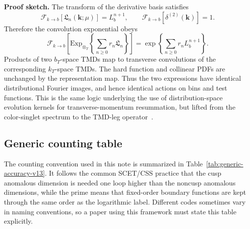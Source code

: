\documentclass[11pt]{article}
\newcommand{\bk}{\bm{k}}
\newcommand{\deltaT}{\delta^{(2)}}
\newcommand{\ExpT}{\mathrm{Exp}_{\otimes_T}}
\begin{document}
\noindent\textbf{Proof sketch.}
The transform of the derivative basis satisfies
\begin{equation}
  \mathcal F_{k\to b}\!\left[\mathfrak L_n(\bk;\mu)\right]=L_b^{n+1},
  \qquad
  \mathcal F_{k\to b}\!\left[\deltaT(\bk)\right]=1 .
  \label{eq:accuracy-transform-dictionary-v13}
\end{equation}
Therefore the convolution exponential obeys
\begin{equation}
  \mathcal F_{k\to b}\!\left[
  \ExpT\left\{\sum_{n\ge0} r_n\mathfrak L_n\right\}
  \right]
  =
  \exp\!\left\{\sum_{n\ge0}r_nL_b^{n+1}\right\}.
  \label{eq:accuracy-exponential-proof-v13}
\end{equation}
Products of two $b_T$-space TMDs map to transverse convolutions of the corresponding
$k_T$-space TMDs.  The hard function and collinear PDFs are unchanged by the
representation map.  Thus the two expressions have identical distributional Fourier images,
and hence identical actions on bins and test functions.  This is the same logic underlying the
use of distribution-space evolution kernels for transverse-momentum resummation, but lifted
from the color-singlet spectrum to the TMD-leg operator~\cite{EbertTackmann2017}.

\subsection{Generic counting table}

The counting convention used in this note is summarized in
Table~\ref{tab:generic-accuracy-v13}.  It follows the common SCET/CSS practice that the
cusp anomalous dimension is needed one loop higher than the noncusp anomalous dimensions,
while the prime means that fixed-order boundary functions are kept through the same order
as the logarithmic label.  Different codes sometimes vary in naming conventions, so a paper
using this framework must state this table explicitly.
\end{document}
